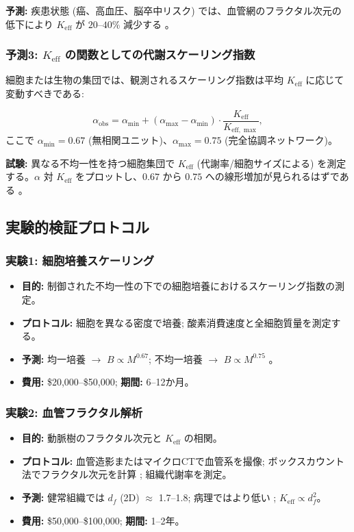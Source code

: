 \documentclass[12pt]{article}
\newcommand{\Keff}{K_{\mathrm{eff}}}
\begin{document}
	\textbf{予測:} 疾患状態 (癌、高血圧、脳卒中リスク) では、血管網のフラクタル次元の低下により \(\Keff\) が \(20\)–\(40\%\) 減少する \cite{Gould1993}。
	
	\subsubsection{予測3: \(\Keff\) の関数としての代謝スケーリング指数}
	
	細胞または生物の集団では、観測されるスケーリング指数は平均 \(\Keff\) に応じて変動すべきである:
	
	\begin{equation}
		\alpha_{\text{obs}} = \alpha_{\min} + (\alpha_{\max} - \alpha_{\min}) \cdot \frac{\Keff}{K_{\mathrm{eff},\max}},
		\label{eq:scaling-exponent}
	\end{equation}
	ここで \(\alpha_{\min} = 0.67\) (無相関ユニット)、\(\alpha_{\max} = 0.75\) (完全協調ネットワーク)。
	
	\textbf{試験:} 異なる不均一性を持つ細胞集団で \(\Keff\) (代謝率/細胞サイズによる) を測定する。\(\alpha\) 対 \(\Keff\) をプロットし、\(0.67\) から \(0.75\) への線形増加が見られるはずである \cite{Takemoto2015}。
	
	\subsection{実験的検証プロトコル}
	
	\subsubsection{実験1: 細胞培養スケーリング}
	\begin{itemize}
		\item \textbf{目的:} 制御された不均一性の下での細胞培養におけるスケーリング指数の測定。
		\item \textbf{プロトコル:} 細胞を異なる密度で培養; 酸素消費速度と全細胞質量を測定する。
		\item \textbf{予測:} 均一培養 \(\rightarrow\) \(B \propto M^{0.67}\); 不均一培養 \(\rightarrow\) \(B \propto M^{0.75}\) \cite{Takemoto2015}。
		\item \textbf{費用:} \$20,000–\$50,000; \textbf{期間:} 6–12か月。
	\end{itemize}
	
	\subsubsection{実験2: 血管フラクタル解析}
	\begin{itemize}
		\item \textbf{目的:} 動脈樹のフラクタル次元と \(\Keff\) の相関。
		\item \textbf{プロトコル:} 血管造影またはマイクロCTで血管系を撮像; ボックスカウント法でフラクタル次元を計算 \cite{Cross1993}; 組織代謝率を測定。
		\item \textbf{予測:} 健常組織では \(d_f\) (2D) \(\approx\) 1.7–1.8; 病理ではより低い \cite{Gould1993}; \(\Keff \propto d_f^2\)。
		\item \textbf{費用:} \$50,000–\$100,000; \textbf{期間:} 1–2年。
	\end{itemize}
	
\end{document}
